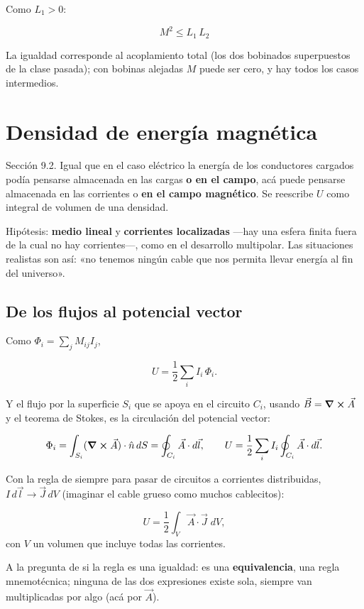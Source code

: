 \documentclass[12pt,a4paper]{article}
\begin{document}
Como $L_1 > 0$:

\begin{keybox}
\[
\boxed{\ M^2 \le L_1\,L_2\ }
\]
\end{keybox}

La igualdad corresponde al acoplamiento total (los dos bobinados superpuestos
de la clase pasada); con bobinas alejadas $M$ puede ser cero, y hay todos los
casos intermedios.

\section{Densidad de energía magnética}

Sección 9.2. Igual que en el caso eléctrico la energía de los conductores
cargados podía pensarse almacenada en las cargas \textbf{o en el campo}, acá puede
pensarse almacenada en las corrientes o \textbf{en el campo magnético}. Se reescribe
$U$ como integral de volumen de una densidad.

Hipótesis: \textbf{medio lineal} y \textbf{corrientes localizadas} ---hay una esfera finita
fuera de la cual no hay corrientes---, como en el desarrollo multipolar. Las
situaciones realistas son así: «no tenemos ningún cable que nos permita llevar
energía al fin del universo».

\subsection{De los flujos al potencial vector}

Como $\Phi_i = \sum_j M_{ij} I_j$,

\[
U = \frac12\sum_i I_i\,\Phi_i .
\]

Y el flujo por la superficie $S_i$ que se apoya en el circuito $C_i$, usando
$\vec B = \curl\vec A$ y el teorema de Stokes, es la circulación del potencial
vector:

\[
\Phi_i = \int_{S_i}(\curl\vec A)\cdot\hat n\,dS = \oint_{C_i}\vec A\cdot d\vec l,
\qquad
U = \frac12\sum_i I_i\oint_{C_i}\vec A\cdot d\vec l .
\]

Con la regla de siempre para pasar de circuitos a corrientes distribuidas,
$I\,d\vec l\to\vec J\,dV$ (imaginar el cable grueso como muchos cablecitos):

\[
U = \frac12\int_V \vec A\cdot\vec J\;dV,
\]
con $V$ un volumen que incluye todas las corrientes.

\begin{notebox}
A la pregunta de si la regla es una igualdad: es una \textbf{equivalencia}, una
regla mnemotécnica; ninguna de las dos expresiones existe sola, siempre van
multiplicadas por algo (acá por $\vec A$).
\end{notebox}
\end{document}
